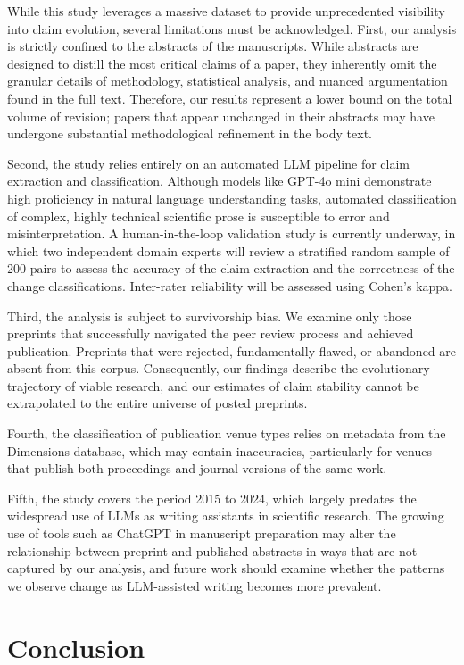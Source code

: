 \documentclass[11pt]{article}
\begin{document}
While this study leverages a massive dataset to provide unprecedented visibility into claim evolution, several limitations must be acknowledged. First, our analysis is strictly confined to the abstracts of the manuscripts. While abstracts are designed to distill the most critical claims of a paper, they inherently omit the granular details of methodology, statistical analysis, and nuanced argumentation found in the full text. Therefore, our results represent a lower bound on the total volume of revision; papers that appear unchanged in their abstracts may have undergone substantial methodological refinement in the body text.

Second, the study relies entirely on an automated LLM pipeline for claim extraction and classification. Although models like GPT-4o mini demonstrate high proficiency in natural language understanding tasks, automated classification of complex, highly technical scientific prose is susceptible to error and misinterpretation. A human-in-the-loop validation study is currently underway, in which two independent domain experts will review a stratified random sample of 200 pairs to assess the accuracy of the claim extraction and the correctness of the change classifications. Inter-rater reliability will be assessed using Cohen's kappa.

Third, the analysis is subject to survivorship bias. We examine only those preprints that successfully navigated the peer review process and achieved publication. Preprints that were rejected, fundamentally flawed, or abandoned are absent from this corpus. Consequently, our findings describe the evolutionary trajectory of viable research, and our estimates of claim stability cannot be extrapolated to the entire universe of posted preprints.

Fourth, the classification of publication venue types relies on metadata from the Dimensions database, which may contain inaccuracies, particularly for venues that publish both proceedings and journal versions of the same work.

Fifth, the study covers the period 2015 to 2024, which largely predates the widespread use of LLMs as writing assistants in scientific research. The growing use of tools such as ChatGPT in manuscript preparation may alter the relationship between preprint and published abstracts in ways that are not captured by our analysis, and future work should examine whether the patterns we observe change as LLM-assisted writing becomes more prevalent.

\section{Conclusion}
\end{document}
